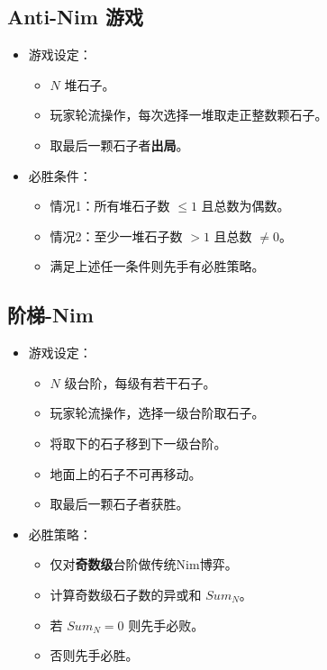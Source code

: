 \documentclass[a4paper,12pt]{article}
\begin{document}
\subsection{Anti-Nim 游戏}

\begin{itemize}
    \item 游戏设定：
    \begin{itemize}
        \item $N$ 堆石子。
        \item 玩家轮流操作，每次选择一堆取走正整数颗石子。
        \item 取最后一颗石子者\textbf{出局}。
    \end{itemize}
    
    \item 必胜条件：
    \begin{itemize}
        \item 情况1：所有堆石子数 $\leq 1$ 且总数为偶数。
        \item 情况2：至少一堆石子数 $>1$ 且总数 $\neq 0$。
        \item 满足上述任一条件则先手有必胜策略。
    \end{itemize}
\end{itemize}

\subsection{阶梯-Nim} 

\begin{itemize}
    \item 游戏设定：
    \begin{itemize}
        \item $N$ 级台阶，每级有若干石子。
        \item 玩家轮流操作，选择一级台阶取石子。
        \item 将取下的石子移到下一级台阶。
        \item 地面上的石子不可再移动。
        \item 取最后一颗石子者获胜。
    \end{itemize}
    
    \item 必胜策略：
    \begin{itemize}
        \item 仅对\textbf{奇数级}台阶做传统Nim博弈。
        \item 计算奇数级石子数的异或和 $Sum_N$。
        \item 若 $Sum_N = 0$ 则先手必败。
        \item 否则先手必胜。
    \end{itemize}
\end{itemize}
\end{document}
